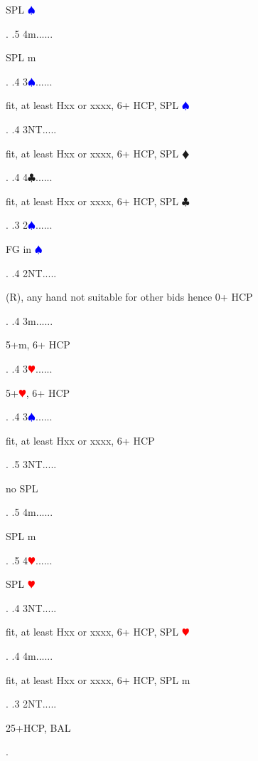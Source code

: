\documentclass[a4paper]{article}
\newcommand{\BC}{\textcolor{OliveGreen}{$\clubsuit$}}
\newcommand{\BD}{\textcolor{RedOrange}{$\vardiamondsuit$}}
\newcommand{\BH}{\textcolor{Red}{$\varheartsuit${}}}
\newcommand{\BS}{\textcolor{Blue}{$\spadesuit${}}}
\begin{document}
{\begin{minipage}[t]{0.8\textwidth}
SPL \BS 
\end{minipage}. 
 .5 4m......\begin{minipage}[t]{0.8\textwidth}
SPL m
\end{minipage}. 
 .4 3\BS......\begin{minipage}[t]{0.8\textwidth}
fit, at least Hxx or xxxx, 6+ HCP, SPL \BS 
\end{minipage}. 
 .4 3NT.....\begin{minipage}[t]{0.8\textwidth}
fit, at least Hxx or xxxx, 6+ HCP, SPL \BD 
\end{minipage}. 
 .4 4\BC......\begin{minipage}[t]{0.8\textwidth}
fit, at least Hxx or xxxx, 6+ HCP, SPL \BC 
\end{minipage}. 
 .3 2\BS......\begin{minipage}[t]{0.8\textwidth}
FG in \BS 
\end{minipage}. 
 .4 2NT.....\begin{minipage}[t]{0.8\textwidth}
(R), any hand not suitable for other bids hence 0+ HCP
\end{minipage}. 
 .4 3m......\begin{minipage}[t]{0.8\textwidth}
5+m, 6+ HCP
\end{minipage}. 
 .4 3\BH......\begin{minipage}[t]{0.8\textwidth}
5+\BH , 6+ HCP
\end{minipage}. 
 .4 3\BS......\begin{minipage}[t]{0.8\textwidth}
fit, at least Hxx or xxxx, 6+ HCP
\end{minipage}. 
 .5 3NT.....\begin{minipage}[t]{0.8\textwidth}
no SPL
\end{minipage}. 
 .5 4m......\begin{minipage}[t]{0.8\textwidth}
SPL m
\end{minipage}. 
 .5 4\BH......\begin{minipage}[t]{0.8\textwidth}
SPL \BH 
\end{minipage}. 
 .4 3NT.....\begin{minipage}[t]{0.8\textwidth}
fit, at least Hxx or xxxx, 6+ HCP, SPL \BH 
\end{minipage}. 
 .4 4m......\begin{minipage}[t]{0.8\textwidth}
fit, at least Hxx or xxxx, 6+ HCP, SPL m
\end{minipage}. 
 .3 2NT.....\begin{minipage}[t]{0.8\textwidth}
25+HCP, BAL
\end{minipage}. 
}
\end{document}
